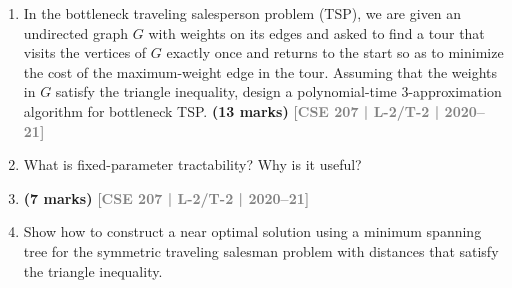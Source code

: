 \documentclass[12pt,a3paper]{article}
\newcommand{\yr}[1]{\hfill\textcolor{gray}{\small\textbf{[#1]}}}
\newcommand{\mk}[1]{\textcolor{orange!70!black}{\small\textbf{(#1 marks)}}}
\begin{document}
\begin{enumerate}
\begin{enumerate}
\item Prove that for any $\varepsilon > 0$, the approximation algorithm computes a feasible solution whose value is within a $(1 + \varepsilon)$ factor of the optimum in $O(n^3/\varepsilon)$.
\mk{15} \yr{CSE 207 | L-2/T-2 | 2021--22}
\end{enumerate}
\item In the bottleneck traveling salesperson problem (TSP), we are given an undirected graph $G$ with weights on its edges and asked to find a tour that visits the vertices of $G$ exactly once and returns to the start so as to minimize the cost of the maximum-weight edge in the tour. Assuming that the weights in $G$ satisfy the triangle inequality, design a polynomial-time 3-approximation algorithm for bottleneck TSP.
\mk{13} \yr{CSE 207 | L-2/T-2 | 2020--21}

\item What is fixed-parameter tractability? Why is it useful?
\item \mk{7} \yr{CSE 207 | L-2/T-2 | 2020--21}

\item Show how to construct a near optimal solution using a minimum spanning tree for the symmetric traveling salesman problem with distances that satisfy the triangle inequality.
\begin{center}
\end{center}
\end{enumerate}
\end{document}
